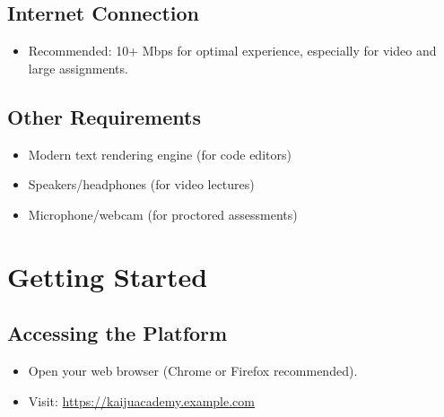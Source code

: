 \documentclass[a4paper,11pt]{scrartcl}
\begin{document}
\subsection{Internet Connection}
\begin{itemize}[leftmargin=*]
    \item Recommended: 10+ Mbps for optimal experience, especially for video and large assignments.
\end{itemize}
\subsection{Other Requirements}
\begin{itemize}[leftmargin=*]
    \item Modern text rendering engine (for code editors)
    \item Speakers/headphones (for video lectures)
    \item Microphone/webcam (for proctored assessments)
\end{itemize}

\section{Getting Started}

\subsection{Accessing the Platform}
\begin{itemize}[leftmargin=*]
    \item Open your web browser (Chrome or Firefox recommended).
    \item Visit: \url{https://kaijuacademy.example.com}
\end{itemize}
\end{document}
